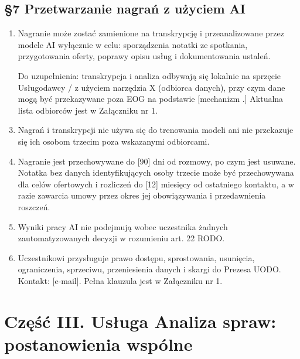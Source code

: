 \documentclass[11pt,a4paper]{article}
\begin{document}
\subsection*{§7 Przetwarzanie nagrań z użyciem AI}
\begin{enumerate}
\item Nagranie może zostać zamienione na transkrypcję i przeanalizowane przez modele AI wyłącznie w celu: sporządzenia notatki ze spotkania, przygotowania oferty, poprawy opisu usług i dokumentowania ustaleń.
\item [Do uzupełnienia: transkrypcja i analiza odbywają się lokalnie na sprzęcie Usługodawcy / z użyciem narzędzia X (odbiorca danych), przy czym dane mogą być przekazywane poza EOG na podstawie [mechanizm].] Aktualna lista odbiorców jest w Załączniku nr 1.
\item Nagrań i transkrypcji nie używa się do trenowania modeli ani nie przekazuje się ich osobom trzecim poza wskazanymi odbiorcami.
\item Nagranie jest przechowywane do [90] dni od rozmowy, po czym jest usuwane. Notatka bez danych identyfikujących osoby trzecie może być przechowywana dla celów ofertowych i rozliczeń do [12] miesięcy od ostatniego kontaktu, a w razie zawarcia umowy przez okres jej obowiązywania i przedawnienia roszczeń.
\item Wyniki pracy AI nie podejmują wobec uczestnika żadnych zautomatyzowanych decyzji w rozumieniu art. 22 RODO.
\item Uczestnikowi przysługuje prawo dostępu, sprostowania, usunięcia, ograniczenia, sprzeciwu, przeniesienia danych i skargi do Prezesa UODO. Kontakt: [e-mail]. Pełna klauzula jest w Załączniku nr 1.
\end{enumerate}

\section*{Część III. Usługa Analiza spraw: postanowienia wspólne}
\end{document}
